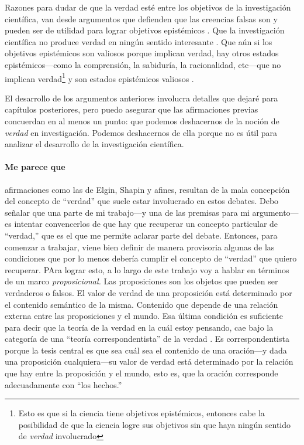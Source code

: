 Razones para dudar de que la verdad esté entre los objetivos de la investigación
científica, van desde argumentos que defienden que las creencias falsas son y
pueden ser de utilidad para lograr objetivos epistémicos \parencite{elgin2004,
elgin2017true}. Que la investigación científica no produce verdad en ningún sentido
interesante \parencite{Shapin1995}. Que aún si los objetivos epistémicos son valiosos
porque implican verdad, hay otros estados epistémicos---como la comprensión, la
sabiduría, la racionalidad, etc---que no implican verdad\footnote{Esto es que si la
ciencia tiene objetivos epistémicos, entonces cabe la posibilidad de que la ciencia
logre sus objetivos sin que haya ningún sentido de \textit{verdad} involucrado} y son
estados epistémicos valiosos \parencite{kvanvig2003}.

El desarrollo de los argumentos anteriores involucra detalles que dejaré para
capítulos posteriores, pero puedo asegurar que las afirmaciones previas concuerdan en
al menos un punto: que podemos deshacernos de la noción de \textit{verdad} en
investigación. Podemos deshacernos de ella porque no es útil para analizar el
desarrollo de la investigación científica.

\paragraph{Me parece que} afirmaciones como las de Elgin, Shapin y afines, resultan
de la mala concepción del concepto de ``verdad'' que suele estar involucrado en estos
debates. Debo señalar que una parte de mi trabajo---y una de las premisas para mi
argumento---es intentar convencerlos de que hay que recuperar un concepto particular
de ``verdad,'' que es el que me permite aclarar parte del debate. Entonces, para
comenzar a trabajar, viene bien definir de manera provisoria algunas de las
condiciones que por lo menos debería cumplir el concepto de ``verdad'' que quiero
recuperar. PAra lograr esto, a lo largo de este trabajo voy a hablar en términos de un
marco \textit{proposicional.} Las proposiciones son los objetos que pueden ser
verdaderos o falsos. El valor de verdad de una proposición está determinado por el
contenido semántico de la misma. Contenido que depende de una relación externa entre
las proposiciones y el mundo. Esa última condición es suficiente para decir que la
teoría de la verdad en la cuál estoy pensando, cae bajo la categoría de una ``teoría
correspondentista'' de la verdad \cite{rasmussen2014, sep-truth}. Es
correspondentista porque la tesis central es que sea cuál sea el contenido de una
oración---y dada una proposición cualquiera---su valor de verdad está determinado por
la relación que hay entre la proposición y el mundo, esto es, que la oración
corresponde adecuadamente con ``los hechos.''

